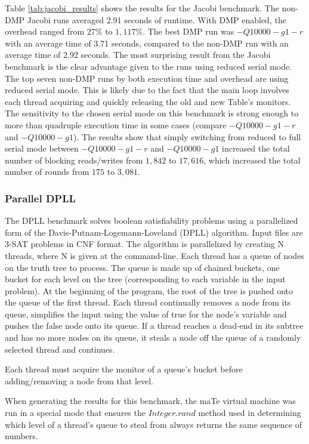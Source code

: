 Table \ref{tab:jacobi_results} shows the results for the Jacobi
benchmark.  The non-DMP Jacobi runs averaged 2.91 seconds of runtime.
With DMP enabled, the overhead ranged from $27\%$ to $1,117\%$.  The
best DMP run was $-Q10000 -g1 -r$ with an average time of 3.71
seconds, compared to the non-DMP run with an average time of 2.92
seconds.  The most surprising result from the Jacobi benchmark is the
clear advantage given to the runs using reduced serial mode.  The top
seven non-DMP runs by both execution time and overhead are using
reduced serial mode.  This is likely due to the fact that the main
loop involves each thread acquiring and quickly releasing the old and
new Table's monitors.  The sensitivity to the chosen serial mode on
this benchmark is strong enough to more than quadruple execution time
in some cases (compare $-Q10000 -g1 -r$ and $-Q10000 -g1$).  The
results show that simply switching from reduced to full serial mode
between $-Q10000 -g1 -r$ and $-Q10000 -g1$ increased the total number
of blocking reads/writes from $1,842$ to $17,616$, which increased the
total number of rounds from $175$ to $3,081$.

\subsubsection{Parallel DPLL}

The DPLL benchmark solves boolean satisfiability problems using a
parallelized form of the Davis-Putnam-Logemann-Loveland (DPLL)
algorithm.  Input files are 3-SAT problems in CNF format.  The
algorithm is parallelized by creating N threads, where N is given at
the command-line.  Each thread has a queue of nodes on the truth tree
to process.  The queue is made up of chained buckets, one bucket for
each level on the tree (corresponding to each variable in the input
problem).  At the beginning of the program, the root of the tree is
pushed onto the queue of the first thread.  Each thread continually
removes a node from its queue, simplifies the input using the value of
true for the node's variable and pushes the false node onto its queue.
If a thread reaches a dead-end in its subtree and has no more nodes on
its queue, it steals a node off the queue of a randomly selected
thread and continues.

Each thread must acquire the monitor of a queue's bucket before
adding/removing a node from that level.

When generating the results for this benchmark, the maTe virtual
machine was run in a special mode that ensures the $Integer.rand$
method used in determining which level of a thread's queue to steal
from always returns the same sequence of numbers.

